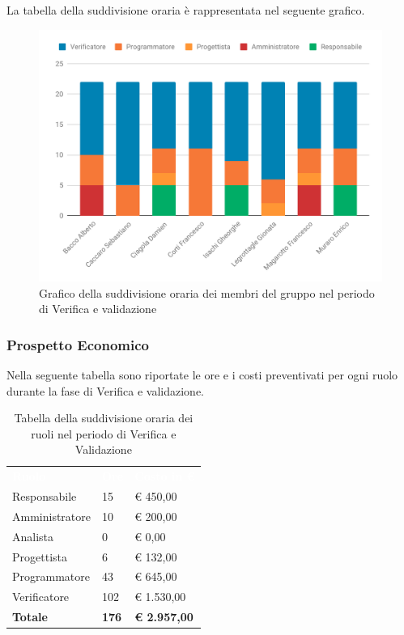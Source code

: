 La tabella della suddivisione oraria è rappresentata nel seguente grafico.
\begin{figure}[H]
	\includegraphics[width=1\linewidth]{Preventivo/grafici/VV1_1.pdf}
	\caption{Grafico della suddivisione oraria dei membri del gruppo nel periodo di Verifica e validazione}
\end{figure}

\subsubsection{Prospetto Economico}
Nella seguente tabella sono riportate le ore e i costi preventivati per ogni ruolo durante la fase di Verifica e validazione.


\begin{table}[H]	
	\begin{center}
	    \begin{tabular}{C{4cm}C{1cm}C{3,5cm}}
			\textcolor{white}{\textbf{Ruolo}} & \textcolor{white}{\textbf{Ore}} & \textcolor{white}{\textbf{Costo in €}}
			\\
			Responsabile & 15 & € 450,00 \\
Amministratore & 10 & € 200,00 \\
Analista & 0 & € 0,00 \\
Progettista & 6 & € 132,00 \\
Programmatore & 43 & € 645,00 \\
Verificatore & 102 & € 1.530,00 \\
\textbf{Totale} & \textbf{176} & \textbf{€ 2.957,00} \\

		\end{tabular}
	    \caption{Tabella della suddivisione oraria dei ruoli nel periodo di Verifica e Validazione} \label{tab:tabellaRuoliVerifica e validazione} 
	\end{center}
\end{table}



